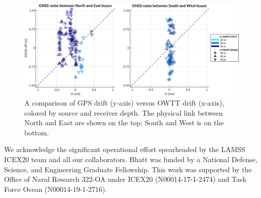\begin{figure}[h!]
	\centering
	\includegraphics[width=\reprintcolumnwidth]{figs/gps-drift-example.pdf} 
	\caption{A comparison of GPS drift (y-axis) versus OWTT drift (x-axis), colored by source and receiver depth. The physical link between North and East are shown on the top; South and West is on the bottom.}
	\label{fig:gps-drift-example}
\end{figure}



\FloatBarrier
\clearpage
\begin{acknowledgments}
We acknowledge the significant operational effort spearheaded by the LAMSS ICEX20 team and all our collaborators.
Bhatt was funded by a National Defense, Science, and Engineering Graduate Fellowship.
This work was supported by the Office of Naval Research 322-OA under ICEX20 (N00014-17-1-2474) and Task Force Ocean (N00014-19-1-2716).

\end{acknowledgments}


